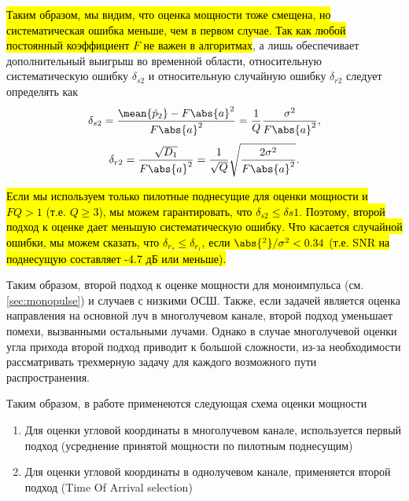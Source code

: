 \hl{
Таким образом, мы видим, что оценка мощности тоже смещена, но систематическая
ошибка меньше, чем в первом случае.
Так как любой постоянный коэффициент $F$ не важен в алгоритмах}, а
лишь обеспечивает дополнительный выигрыш во временной области, относительную
систематическую ошибку $\delta_{s2}$ и относительную случайную ошибку $\delta_{r2}$ следует
определять как
\begin{equation}
    \delta_{s2} = \frac{\mean{\hat p_2} - F \abs{a}^2}{F \abs{a}^2} = \frac{1}{Q} \frac{\sigma^2}{F\abs{a}^2},
\end{equation}
\begin{equation}
    \delta_{r2} = \frac{\sqrt{D_1}}{F\abs{a}^2} = \frac{1}{\sqrt Q} \sqrt{\frac{2\sigma^2}{F\abs{a}^2}}.
\end{equation}

\hl{
Если мы используем только пилотные поднесущие для оценки мощности и $FQ > 1$ (т.е. $Q\geq 3$),
мы можем гарантировать, что $\delta_{s2} \leq \delta{s1}$. Поэтому, второй подход к оценке дает меньшую
систематическую ошибку. Что касается случайной ошибки, мы можем сказать, что $\delta_{r_2} \leq \delta_{r_1}$, если
$\abs{^2}/\sigma^2 < 0.34$ (т.е. SNR на поднесущую составляет -4.7 дБ или меньше).
}

Таким образом, второй подход к оценке мощности для моноимпульса (см. \ref{sec:monopulse}) и случаев с
низкими ОСШ. Также, если задачей является оценка направления на основной луч в
многолучевом канале, второй подход уменьшает помехи, вызванными остальными лучами.
Однако в случае многолучевой оценки угла прихода второй подход приводит к
большой сложности, из-за необходимости рассматривать трехмерную задачу для
каждого возможного пути распространения.

Таким образом, в работе применеются следующая схема оценки мощности
\begin{enumerate}
    \item Для оценки угловой координаты в многолучевом канале, используется первый подход (усреднение принятой мощности по пилотным поднесущим) \\
    \item Для оценки угловой координаты в однолучевом канале, применяется второй подход (Time Of Arrival selection) \\
\end{enumerate}
